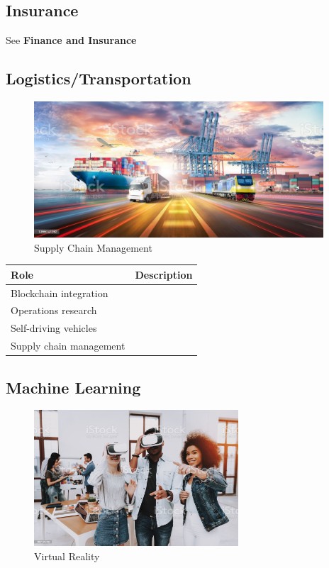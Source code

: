 \subsection{Insurance}
See \textbf{Finance and Insurance}

\subsection{Logistics/Transportation}

\begin{figure}[H]
	\begin{center}
		\caption{Supply Chain Management}
		\vskip 4pt
		\includegraphics[height=2in]{images/careers/istockphoto-1399747292-1024x1024.jpg}
	\end{center}
\end{figure}

\begin{table}[H]
	\begin{center}
		\begin{tabular}{p{1.3in}|p{3in}} 
			\textbf{Role} & \textbf{Description}\\
			\hline
			Blockchain integration & \\
			\hline
			Operations research & \\
			\hline
			Self-driving vehicles & \\
			\hline
			Supply chain management & \\
			\hline
		\end{tabular}
	\end{center}
\end{table}

\subsection{Machine Learning}

\begin{figure}[H]
	\begin{center}
		\caption{Virtual Reality}
		\vskip 4pt
		\includegraphics[height=2in]{images/careers/istockphoto-1051052494-1024x1024.jpg}
	\end{center}
\end{figure}

